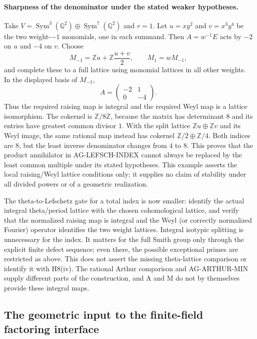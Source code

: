 \paragraph{Sharpness of the denominator under the stated weaker hypotheses.}
Take $V=\operatorname{Sym}^3(\mathbb Q^2)\oplus
\operatorname{Sym}^7(\mathbb Q^2)$ and $r=1$.
Let $u=xy^2$ and $v=x^3y^4$ be the two weight-$-1$ monomials,
one in each summand. Then $A=w^{-1}E$ acts by $-2$ on $u$
and $-4$ on $v$. Choose
\[
 M_{-1}=\mathbb Zu+\mathbb Z\frac{u+v}{2},\qquad
 M_1=wM_{-1},
\]
and complete these to a full lattice using monomial lattices
in all other weights. In the displayed basis of $M_{-1}$,
\[
 A=\begin{pmatrix}-2&1\\0&-4\end{pmatrix}.
\]
Thus the required raising map is integral and the required
Weyl map is a lattice isomorphism. The cokernel is
$\mathbb Z/8\mathbb Z$, because the matrix has determinant
$8$ and its entries have greatest common divisor $1$.
With the split lattice $\mathbb Zu\oplus\mathbb Zv$ and its
Weyl image, the same rational map instead has cokernel
$\mathbb Z/2\oplus\mathbb Z/4$. Both indices are $8$,
but the least inverse denominator changes from $4$ to $8$.
This proves that the product annihilator in AG-LEFSCH-INDEX
cannot always be replaced by the least common multiple under
its stated hypotheses. This example asserts the local
raising/Weyl lattice conditions only; it supplies no claim
of stability under all divided powers or of a geometric
realization.

The theta-to-Lefschetz gate for a total index is now smaller:
identify the actual integral theta/period lattice with the
chosen cohomological lattice, and verify that the normalized
raising map is integral and the Weyl (or correctly normalized
Fourier) operator identifies the two weight lattices.
Integral isotypic splitting is unnecessary for the index.
It matters for the full Smith group only through the explicit
finite defect sequence; even there, the possible exceptional
primes are restricted as above. This does not assert the
missing theta-lattice comparison or identify it with H8(iv).
The rational Arthur comparison and AG-ARTHUR-MIN supply
different parts of the construction, and A and M do not by
themselves provide these integral maps.

\subsection{The geometric input to the finite-field factoring interface}

